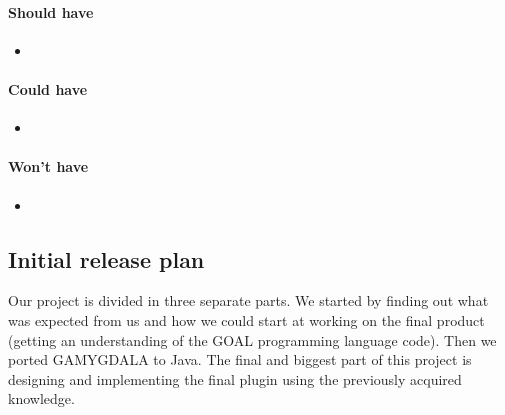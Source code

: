 \paragraph{Should have} 
\begin{itemize}
\item
\end{itemize}

\paragraph{Could have} 
\begin{itemize}
\item
\end{itemize}

\paragraph{Won't have} 
\begin{itemize}
\item
\end{itemize}

\subsection{Initial release plan}
Our project is divided in three separate parts. We started by finding out what was expected from us and how we could start at working on the final product (getting an understanding of the GOAL programming language code). Then we ported GAMYGDALA to Java. The final and biggest part of this project is designing and implementing the final plugin using the previously acquired knowledge.
